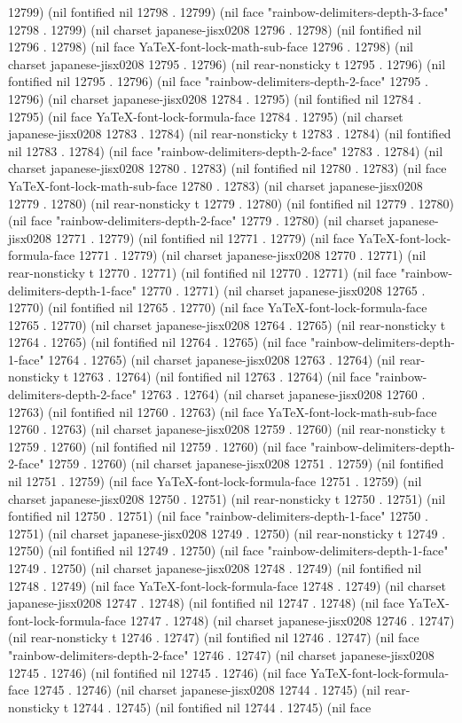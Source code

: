 12799) (nil fontified nil 12798 . 12799) (nil face "rainbow-delimiters-depth-3-face" 12798 . 12799) (nil charset japanese-jisx0208 12796 . 12798) (nil fontified nil 12796 . 12798) (nil face YaTeX-font-lock-math-sub-face 12796 . 12798) (nil charset japanese-jisx0208 12795 . 12796) (nil rear-nonsticky t 12795 . 12796) (nil fontified nil 12795 . 12796) (nil face "rainbow-delimiters-depth-2-face" 12795 . 12796) (nil charset japanese-jisx0208 12784 . 12795) (nil fontified nil 12784 . 12795) (nil face YaTeX-font-lock-formula-face 12784 . 12795) (nil charset japanese-jisx0208 12783 . 12784) (nil rear-nonsticky t 12783 . 12784) (nil fontified nil 12783 . 12784) (nil face "rainbow-delimiters-depth-2-face" 12783 . 12784) (nil charset japanese-jisx0208 12780 . 12783) (nil fontified nil 12780 . 12783) (nil face YaTeX-font-lock-math-sub-face 12780 . 12783) (nil charset japanese-jisx0208 12779 . 12780) (nil rear-nonsticky t 12779 . 12780) (nil fontified nil 12779 . 12780) (nil face "rainbow-delimiters-depth-2-face" 12779 . 12780) (nil charset japanese-jisx0208 12771 . 12779) (nil fontified nil 12771 . 12779) (nil face YaTeX-font-lock-formula-face 12771 . 12779) (nil charset japanese-jisx0208 12770 . 12771) (nil rear-nonsticky t 12770 . 12771) (nil fontified nil 12770 . 12771) (nil face "rainbow-delimiters-depth-1-face" 12770 . 12771) (nil charset japanese-jisx0208 12765 . 12770) (nil fontified nil 12765 . 12770) (nil face YaTeX-font-lock-formula-face 12765 . 12770) (nil charset japanese-jisx0208 12764 . 12765) (nil rear-nonsticky t 12764 . 12765) (nil fontified nil 12764 . 12765) (nil face "rainbow-delimiters-depth-1-face" 12764 . 12765) (nil charset japanese-jisx0208 12763 . 12764) (nil rear-nonsticky t 12763 . 12764) (nil fontified nil 12763 . 12764) (nil face "rainbow-delimiters-depth-2-face" 12763 . 12764) (nil charset japanese-jisx0208 12760 . 12763) (nil fontified nil 12760 . 12763) (nil face YaTeX-font-lock-math-sub-face 12760 . 12763) (nil charset japanese-jisx0208 12759 . 12760) (nil rear-nonsticky t 12759 . 12760) (nil fontified nil 12759 . 12760) (nil face "rainbow-delimiters-depth-2-face" 12759 . 12760) (nil charset japanese-jisx0208 12751 . 12759) (nil fontified nil 12751 . 12759) (nil face YaTeX-font-lock-formula-face 12751 . 12759) (nil charset japanese-jisx0208 12750 . 12751) (nil rear-nonsticky t 12750 . 12751) (nil fontified nil 12750 . 12751) (nil face "rainbow-delimiters-depth-1-face" 12750 . 12751) (nil charset japanese-jisx0208 12749 . 12750) (nil rear-nonsticky t 12749 . 12750) (nil fontified nil 12749 . 12750) (nil face "rainbow-delimiters-depth-1-face" 12749 . 12750) (nil charset japanese-jisx0208 12748 . 12749) (nil fontified nil 12748 . 12749) (nil face YaTeX-font-lock-formula-face 12748 . 12749) (nil charset japanese-jisx0208 12747 . 12748) (nil fontified nil 12747 . 12748) (nil face YaTeX-font-lock-formula-face 12747 . 12748) (nil charset japanese-jisx0208 12746 . 12747) (nil rear-nonsticky t 12746 . 12747) (nil fontified nil 12746 . 12747) (nil face "rainbow-delimiters-depth-2-face" 12746 . 12747) (nil charset japanese-jisx0208 12745 . 12746) (nil fontified nil 12745 . 12746) (nil face YaTeX-font-lock-formula-face 12745 . 12746) (nil charset japanese-jisx0208 12744 . 12745) (nil rear-nonsticky t 12744 . 12745) (nil fontified nil 12744 . 12745) (nil face 